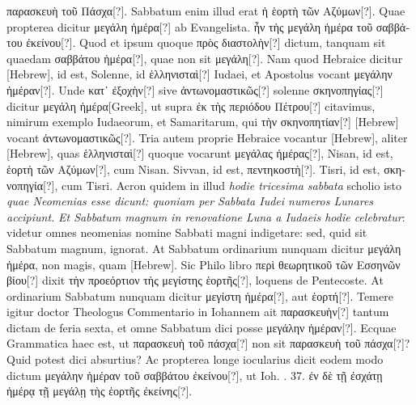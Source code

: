  \textgreek{παρασκευὴ τοῦ Πάσχα[?]}.
Sabbatum enim
illud erat \textgreek{ἡ ἑορτὴ τῶν Αζύμων[?]}.
Quae propterea dicitur \textgreek{μεγάλη ἡμέρα[?]}
ab Evangelista.
\textgreek{ἦν τὴς μεγάλη ἡμέρα τοῦ σαββάτου ἐκείνου[?]}.
Quod
et ipsum quoque \textgreek{πρὸς διαστολὴν[?]} dictum, tanquam sit quaedam
 \textgreek{σαββάτου ἡμέρα[?]},
quae non sit \textgreek{μεγάλη[?]}.
Nam quod Hebraice dicitur \texthebrew{}[Hebrew],
id est, Solenne, id \textgreek{ἑλληνισταὶ[?]} Iudaei, et Apostolus vocant
 \textgreek{μεγάλην
ἡμέραν[?]}.
Unde \textgreek{κατ᾽ ἐξοχὴν[?]} sive
 \textgreek{ἀντωνομαστικῶς[?]} solenne
 \textgreek{σκηνοπηγίας[?]}
dicitur \textgreek{μεγάλη ἡμέρα[Greek]},
 ut supra \textgreek{ἐκ τὴς περιόδου Πέτρου[?]} citavimus, nimirum
exemplo Iudaeorum, et Samaritarum, qui \textgreek{τὴν σκηνοπητίαν[?]}
\texthebrew{}[Hebrew] vocant \textgreek{ἀντωνομαστικῶς[?]}.
Tria autem proprie Hebraice vocantur \texthebrew{}[Hebrew],
aliter \texthebrew{}[Hebrew], quas \textgreek{ἑλληνισταὶ[?]} quoque vocarunt
 \textgreek{μεγάλας
ἡμέρας[?]},  Nisan, id est, \textgreek{ἑορτὴ τῶν Αζύμων[?]},
 cum  Nisan.
 Sivvan,
id est, \textgreek{πεντηκοστὴ[?]}.
 Tisri, id est, \textgreek{σκηνοπηγία[?]}, cum
  Tisri.
Acron quidem in illud \textit{\emd{} hodie tricesima sabbata}
 scholio isto
\textit{quae Neomenias esse dicunt: quoniam per Sabbata Iudei numeros Lunares
accipiunt.}
%
\textit{Et Sabbatum magnum in renovatione Luna a Iudaeis
hodie celebratur}: videtur omnes neomenias nomine Sabbati
magni indigetare: sed, quid sit Sabbatum magnum, ignorat.
At
Sabbatum ordinarium nunquam dicitur \textgreek{μεγάλη ἡμέρα},
 non magis,
quam \texthebrew{}[Hebrew].
Sic Philo libro \textgreek{περὶ θεωρητικοῦ τῶν Εσσηνῶν βίου[?]}
 dixit \textgreek{τὴν
προεόρτιον τὴς μεγίστης ἑορτῆς[?]}, loquens de Pentecoste.
At ordinarium
Sabbatum nunquam dicitur \textgreek{μεγίστη ἡμέρα[?]},
 aut \textgreek{ἑορτή[?]}.
Temere igitur
doctor Theologus Commentario in Iohannem ait \textgreek{παρασκευὴν[?]}
tantum dictam de feria sexta, et omne Sabbatum dici posse
 \textgreek{μεγάλην
ἡμέραν[?]}.
Ecquae Grammatica haec est, ut \textgreek{παρασκευὴ τοῦ πάσχα[?]}
non sit \textgreek{παρασκευὴ τοῦ πάσχα[?]}?
Quid potest dici absurtius?
Ac propterea
longe iocularius dicit eodem modo dictum \textgreek{μεγάλην ἡμέραν
τοῦ σαββάτου ἐκείνου[?]},
ut Ioh. . 37. \textgreek{ἐν δὲ τῇ ἐσχάτῃ ἡμέρᾳ τῇ μεγάλῃ
τὴς ἑορτῆς ἐκείνης[?]}.
